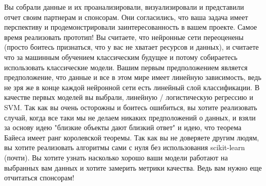

Вы собрали данные и их проанализировали, визуализировали и представили отчет своим партнерам и спонсорам. Они согласились, что ваша задача имеет перспективу и продемонстрировали заинтересованность в вашем проекте. Самое время реализовать прототип! Вы считаете, что нейронные сети переоценены (просто боитесь признаться, что у вас не хватает ресурсов и данных), и считаете что за машинным обучением классическим будущее и потому собираетесь использовать классические модели. Вашим первым предположением является предположение, что данные и все в этом мире имеет линейную зависимость, ведь не зря же в конце каждой нейронной сети есть линейный слой классификации. В качестве первых моделей вы выбрали, линейную / логистическую регрессию и SVM. Так как вы очень осторожны и боитесь ошибиться, вы хотите реализовать случай, когда все таки мы не делаем никаких предположений о данных, и взяли за основу идею "близкие объекты дают близкий ответ"  и идею, что теорема Байеса имеет ранг королевской теоремы. Так как вы не доверяете другим людям, вы хотите реализовать алгоритмы сами с нуля без использования scikit-learn (почти).  Вы хотите узнать насколько хорошо ваши модели работают на выбранных вам данных и хотите замерить метрики качества. Ведь вам нужно еще отчитаться спонсорам!


\pagebreak
